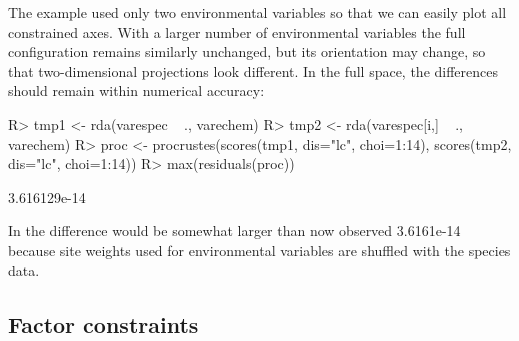 \documentclass[article,nojss]{jss}
\begin{document}
The example used only two environmental variables so that we can
easily plot all constrained axes.  With a larger number of
environmental variables the full configuration remains similarly
unchanged, but its orientation may change, so that two-dimensional
projections look different.  In the full space, the differences should
remain within numerical accuracy:
\begin{Schunk}
\begin{Sinput}
R> tmp1 <- rda(varespec ~ ., varechem)
R> tmp2 <- rda(varespec[i,] ~ ., varechem)
R> proc <- procrustes(scores(tmp1, dis="lc", choi=1:14), scores(tmp2, dis="lc", choi=1:14))
R> max(residuals(proc))
\end{Sinput}
\begin{Soutput}
[1] 3.616129e-14
\end{Soutput}
\end{Schunk}
In  the difference would be somewhat larger than now
observed 3.6161e-14 because site
weights used for environmental variables are shuffled with the species
data.

\subsection{Factor constraints}
\end{document}
